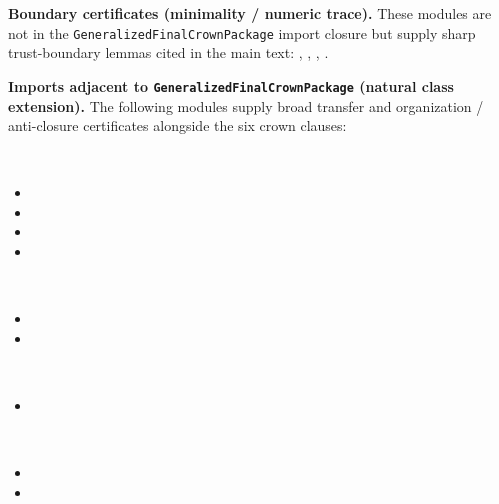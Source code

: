 \documentclass[11pt,a4paper]{article}
\theoremstyle{definition}
\begin{document}
\noindent\textbf{Boundary certificates (minimality / numeric trace).}
These modules are not in the \texttt{GeneralizedFinalCrownPackage} import closure but supply sharp trust-boundary lemmas cited in the main text: , , , .

\noindent\textbf{Imports adjacent to \texttt{GeneralizedFinalCrownPackage} (natural class extension).}
The following modules supply broad transfer and organization / anti-closure certificates alongside the six crown clauses:
\begin{description}[style=nextline, font=\normalfont\ttfamily\small]
\item[Core]\mbox{}\\
\begin{itemize}[leftmargin=1.5em,itemsep=0.12em,nosep]
\item {}
\item {}
\item {}
\item {}
\end{itemize}
\item[Foundation]\mbox{}\\
\begin{itemize}[leftmargin=1.5em,itemsep=0.12em,nosep]
\item {}
\item {}
\end{itemize}
\item[Models]\mbox{}\\
\begin{itemize}[leftmargin=1.5em,itemsep=0.12em,nosep]
\item {}
\end{itemize}
\item[Ridge]\mbox{}\\
\begin{itemize}[leftmargin=1.5em,itemsep=0.12em,nosep]
\item {}
\item {}

\end{itemize}
\end{description}
\end{document}
